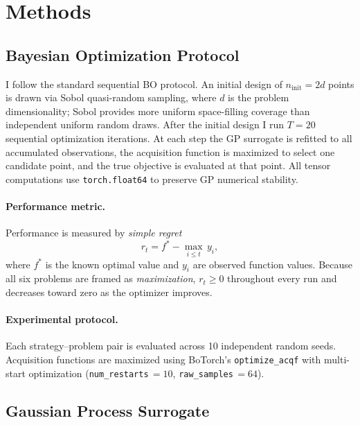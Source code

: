 \section{Methods}
\label{sec:methods}

\subsection{Bayesian Optimization Protocol}
\label{sec:protocol}

I follow the standard sequential BO protocol.
An initial design of $n_{\mathrm{init}} = 2d$ points is drawn via Sobol
quasi-random sampling, where $d$ is the problem dimensionality; Sobol
provides more uniform space-filling coverage than independent uniform
random draws.
After the initial design I run $T = 20$ sequential optimization
iterations.
At each step the GP surrogate is refitted to all accumulated observations,
the acquisition function is maximized to select one candidate point, and
the true objective is evaluated at that point.
All tensor computations use \texttt{torch.float64} to preserve GP
numerical stability.

\paragraph{Performance metric.}
Performance is measured by \emph{simple regret}
\[
  r_t = f^* - \max_{i \le t}\, y_i,
\]
where $f^*$ is the known optimal value and $y_i$ are observed function
values.
Because all six problems are framed as \emph{maximization},
$r_t \ge 0$ throughout every run and decreases toward zero as
the optimizer improves.

\paragraph{Experimental protocol.}
Each strategy–problem pair is evaluated across 10 independent random
seeds.
Acquisition functions are maximized using BoTorch's
\texttt{optimize\_acqf} with multi-start optimization
(\texttt{num\_restarts}\,$= 10$, \texttt{raw\_samples}\,$= 64$).

\subsection{Gaussian Process Surrogate}
\label{sec:gp}

